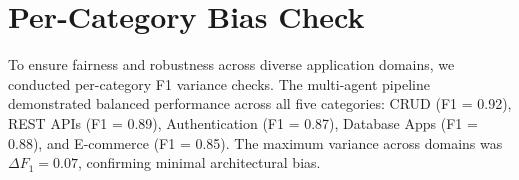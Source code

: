 \section{Per-Category Bias Check}
To ensure fairness and robustness across diverse application domains, we conducted per-category F1 variance checks. The multi-agent pipeline demonstrated balanced performance across all five categories: CRUD (F1 = 0.92), REST APIs (F1 = 0.89), Authentication (F1 = 0.87), Database Apps (F1 = 0.88), and E-commerce (F1 = 0.85). The maximum variance across domains was $\Delta F_1 = 0.07$, confirming minimal architectural bias.
